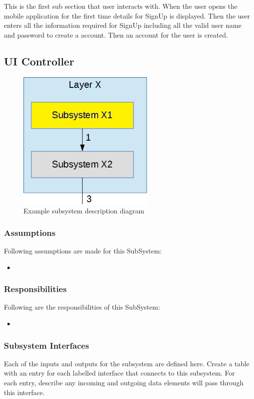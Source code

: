 This is the first sub section that user interacts with. When the user opens the mobile application for the first time details for SignUp is displayed. Then the user enters all the information required for SignUp including all the valid user name and password to create a account. Then an account for the user is created.

\subsection{UI Controller}


\begin{figure}[h!]
	\centering
 	\includegraphics[width=0.60\textwidth]{images/subsystem}
 \caption{Example subsystem description diagram}
\end{figure}

\subsubsection{Assumptions}
Following assumptions are made for this SubSystem:
\begin{itemize}
    \item 
\end{itemize}

\subsubsection{Responsibilities}
Following are the responsibilities of this SubSystem:
\begin{itemize}
    \item 
\end{itemize}

\subsubsection{Subsystem Interfaces}
Each of the inputs and outputs for the subsystem are defined here. Create a table with an entry for each labelled interface that connects to this subsystem. For each entry, describe any incoming and outgoing data elements will pass through this interface.

